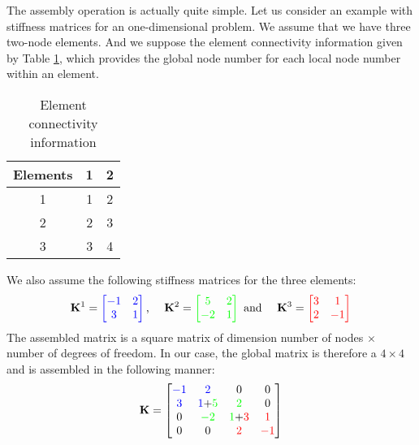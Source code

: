 The assembly operation is actually quite simple. Let us consider an example with stiffness matrices for an one-dimensional problem. We assume that we have three two-node elements. And we suppose the element connectivity information given by Table \ref{chap3:connectivity}, which provides the global node number for each local node number within an element. 
\begin{table}
	\begin{center}
	\begin{tabular}{|c|c|c|}
		\hline Elements & 1 & 2 \\ 
		\hline 1 & 1 & 2 \\ 
		\hline 2 & 2 & 3 \\ 
		\hline 3 & 3 & 4 \\ 
		\hline 
		\end{tabular} \caption{Element connectivity information}
		\label{chap3:connectivity}
	\end{center}
\end{table}
We also assume the following stiffness matrices for the three elements:
\begin{equation}
\mathbf{K}^1 = 
\color{blue}
	\begin{bmatrix}
	-1 & 2 \\
	3 & 1
	\end{bmatrix}
\color{black}
\text{, } \quad 
\mathbf{K}^2 = 
\color{green}
	\begin{bmatrix}
	5 & 2 \\
	-2 & 1
	\end{bmatrix}
\color{black}
\text{ and } \quad 
\mathbf{K}^3 = 
\color{red}
	\begin{bmatrix}
	3 & 1 \\
	2 & -1
	\end{bmatrix}
\color{black}
\end{equation}
The assembled matrix is a square matrix of dimension number of nodes $\times$ number of degrees of freedom. In our case, the global matrix is therefore a $ 4 \times 4 $ and is assembled in the following manner:
\begin{equation}
\mathbf{K} = 
	\begin{bmatrix}
	\color{blue}{-1} & \color{blue}{2} & \color{black}{0} & 0 \\
	\color{blue}{3} & \color{blue}{1}\color{black}{+}\color{green}{5} & \color{green}{2} & \color{black}{0} \\
	0 & \color{green}{-2} & \color{green}{1} \color{black}{+} \color{red}{3} & \color{red}{1} \\
	\color{black}{0} & 0 & \color{red}{2} & \color{red}{-1}
	\end{bmatrix}
\color{black}
\end{equation}
